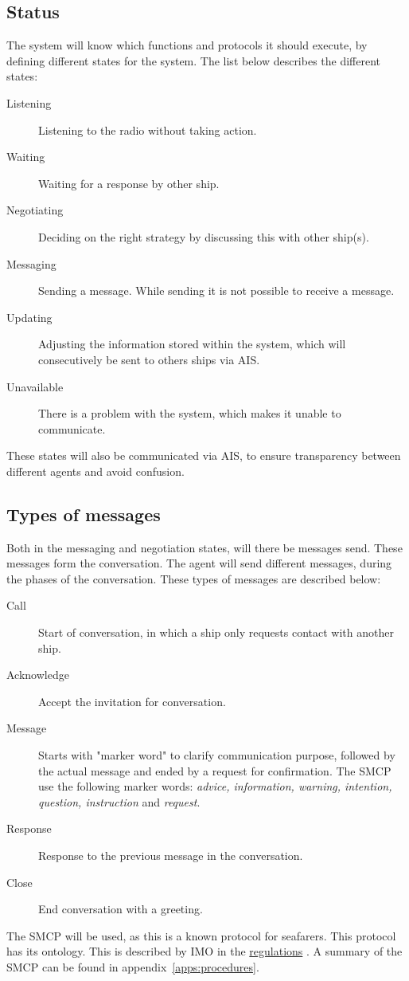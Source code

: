 \subsection{Status}
The system will know which functions and protocols it should execute, by defining different states for the system. The list below describes the different states:
\begin{description}
	\item [Listening] Listening to the radio without taking action.
	\item [Waiting] Waiting for a response by other ship.
	\item [Negotiating] Deciding on the right strategy by discussing this with other ship(s).
	\item [Messaging] Sending a message. While sending it is not possible to receive a message.
	\item [Updating] Adjusting the information stored within the system, which will consecutively be sent to others ships via \ac{AIS}.
	\item [Unavailable] There is a problem with the system, which makes it unable to communicate.
\end{description}
These states will also be communicated via \ac{AIS}, to ensure transparency between different agents and avoid confusion.

\subsection{Types of messages}
Both in the messaging and negotiation states, will there be messages send. These messages form the conversation. The agent will send different messages, during the phases of the conversation. These types of messages are described below:
\begin{description}
	\item [Call] Start of conversation, in which a ship only requests contact with another ship.
	\item [Acknowledge] Accept the invitation for conversation.
	\item [Message] Starts with "marker word" to clarify communication purpose, followed by the actual message and ended by a request for confirmation. The \ac{SMCP} use the following marker words: \emph{advice, information, warning, intention, question, instruction} and \emph{request}.
	\item [Response] Response to the previous message in the conversation.
	\item [Close] End conversation with a greeting.
\end{description}
The \acf{SMCP} will be used, as this is a known protocol for seafarers. This protocol has its ontology. This is described by \ac{IMO} in the \href{https://puc.overheid.nl/doc/PUC_1418_14/1/#16830}{regulations} \cite{IMO2000}. A summary of the \ac{SMCP} can be found in appendix~\ref{apps:procedures}.

